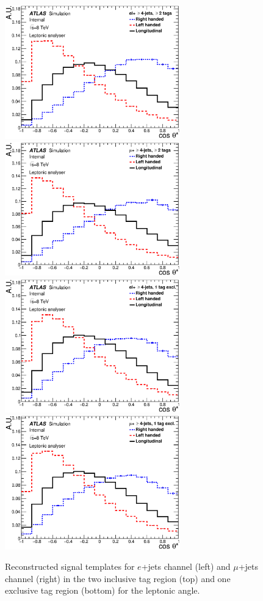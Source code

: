 \begin{figure}[!hb]
  \begin{center}
    \includegraphics[height=58mm]{chapters/whel/figures/templatePlots/Leptonic/Signal_Templates_2incl_el_lep}
    \includegraphics[height=58mm]{chapters/whel/figures/templatePlots/Leptonic/Signal_Templates_2incl_mu_lep}\\
    \includegraphics[height=58mm]{chapters/whel/figures/templatePlots/Leptonic/Signal_Templates_1excl_el_lep}
    \includegraphics[height=58mm]{chapters/whel/figures/templatePlots/Leptonic/Signal_Templates_1excl_mu_lep}
    \caption{Reconstructed signal templates for $e$+jets channel (left) and $\mu$+jets channel (right) in the two inclusive \bt tag region (top) and one exclusive \bt tag region (bottom) for the leptonic angle.}
    \label{fig:Sig_temp_lep}
  \end{center}
\end{figure}


